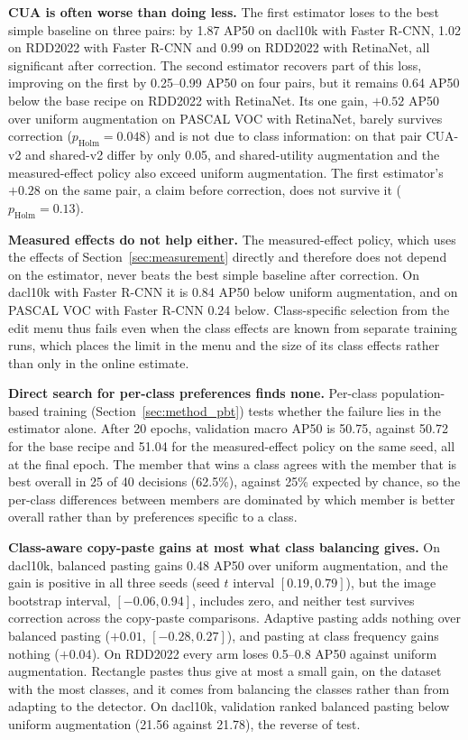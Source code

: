 \documentclass[conference]{IEEEtran}
\begin{document}
\noindent\textbf{CUA is often worse than doing less.} The first estimator loses to the best simple baseline on three pairs: by 1.87 AP50 on dacl10k with Faster R-CNN, 1.02 on RDD2022 with Faster R-CNN and 0.99 on RDD2022 with RetinaNet, all significant after correction. The second estimator recovers part of this loss, improving on the first by 0.25--0.99 AP50 on four pairs, but it remains 0.64 AP50 below the base recipe on RDD2022 with RetinaNet. Its one gain, $+0.52$ AP50 over uniform augmentation on PASCAL VOC with RetinaNet, barely survives correction ($p_{\mathrm{Holm}}=0.048$) and is not due to class information: on that pair CUA-v2 and shared-v2 differ by only 0.05, and shared-utility augmentation and the measured-effect policy also exceed uniform augmentation. The first estimator's $+0.28$ on the same pair, a claim before correction, does not survive it ($p_{\mathrm{Holm}}=0.13$).

\noindent\textbf{Measured effects do not help either.} The measured-effect policy, which uses the effects of Section~\ref{sec:measurement} directly and therefore does not depend on the estimator, never beats the best simple baseline after correction. On dacl10k with Faster R-CNN it is 0.84 AP50 below uniform augmentation, and on PASCAL VOC with Faster R-CNN 0.24 below. Class-specific selection from the edit menu thus fails even when the class effects are known from separate training runs, which places the limit in the menu and the size of its class effects rather than only in the online estimate.

\noindent\textbf{Direct search for per-class preferences finds none.} Per-class population-based training (Section~\ref{sec:method_pbt}) tests whether the failure lies in the estimator alone. After 20 epochs, validation macro AP50 is 50.75, against 50.72 for the base recipe and 51.04 for the measured-effect policy on the same seed, all at the final epoch. The member that wins a class agrees with the member that is best overall in 25 of 40 decisions (62.5\%), against 25\% expected by chance, so the per-class differences between members are dominated by which member is better overall rather than by preferences specific to a class.

\noindent\textbf{Class-aware copy-paste gains at most what class balancing gives.} On dacl10k, balanced pasting gains 0.48 AP50 over uniform augmentation, and the gain is positive in all three seeds (seed $t$ interval $[0.19, 0.79]$), but the image bootstrap interval, $[-0.06, 0.94]$, includes zero, and neither test survives correction across the copy-paste comparisons. Adaptive pasting adds nothing over balanced pasting ($+0.01$, $[-0.28, 0.27]$), and pasting at class frequency gains nothing ($+0.04$). On RDD2022 every arm loses 0.5--0.8 AP50 against uniform augmentation. Rectangle pastes thus give at most a small gain, on the dataset with the most classes, and it comes from balancing the classes rather than from adapting to the detector. On dacl10k, validation ranked balanced pasting below uniform augmentation (21.56 against 21.78), the reverse of test.
\end{document}

